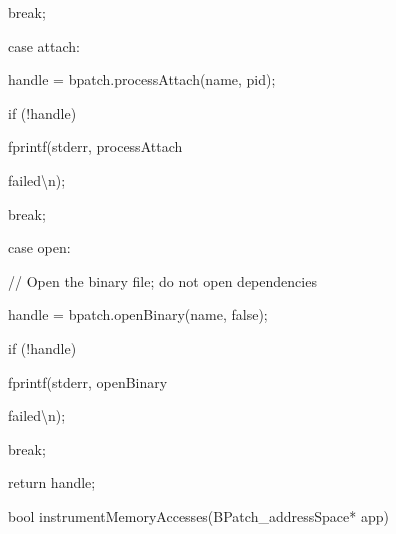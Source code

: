 {{{{

break;}



{

case attach:}



{

handle = bpatch.processAttach(name, pid);}



{

if (!handle) { fprintf(stderr, {\textquotedbl}processAttach

failed{\textbackslash}n{\textquotedbl}); }}



{

break;}





\bigskip



{

case open:}



{

// Open the binary file; do not open dependencies}



{

handle = bpatch.openBinary(name, false);}



{

if (!handle) { fprintf(stderr, {\textquotedbl}openBinary

failed{\textbackslash}n{\textquotedbl}); }}



{

break;}



{

}}





\bigskip



{

return handle;}



{

}}





\bigskip



{

bool instrumentMemoryAccesses(BPatch_addressSpace* app) {}



}}
